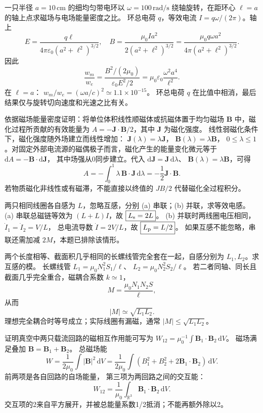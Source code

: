 一只半径 $a=10\,\mathrm{cm}$ 的细均匀带电环以 $\omega=100\,\mathrm{rad/s}$ 绕轴旋转，在距环心 $\ell=a$ 的轴上点求磁场与电场能量密度之比。
\exsolution
环总电荷 $q$，等效电流
$I=q\omega/(2\pi)$。轴上
\[
E=\frac{q\ell}{4\pi\varepsilon_0(a^2+\ell^2)^{3/2}},
\quad
B=\frac{\mu_0Ia^2}{2(a^2+\ell^2)^{3/2}}
=\frac{\mu_0q\omega a^2}{4\pi(a^2+\ell^2)^{3/2}}.
\]
因此
\[
\frac{w_m}{w_e}
=\frac{B^2/(2\mu_0)}{\varepsilon_0E^2/2}
=\boxed{\mu_0\varepsilon_0\frac{\omega^2a^4}{\ell^2}}.
\]
在 $\ell=a$：
$\boxed{w_m/w_e=(\omega a/c)^2\simeq1.1\times10^{-15}}$。
\excheck 环总电荷 $q$ 在比值中相消，最后结果仅与旋转切向速度和光速之比有关。

依据磁场能量密度证明：将单位体积线性顺磁体或抗磁体置于均匀磁场 $\bm B$ 中，磁化过程所贡献的有效能量为
$A=-\bm J\cdot\bm B/2$，其中 $\bm J$ 为磁化强度。
\exsolution
线性弱磁化条件下，磁化强度随外场建立而线性增加：
$\bm J(\lambda)=\lambda\bm J$，
$\bm B(\lambda)=\lambda\bm B$，
$0\le\lambda\le1$。对固定外部电流源的磁偶极子而言，磁化产生的能量变化微元等于
$\mathrm dA=-\bm B\cdot\mathrm d\bm J$，
其中场强从0同步建立。代入
$\mathrm d\bm J=\bm J\,\mathrm d\lambda$、
$\bm B(\lambda)=\lambda\bm B$，可得
\[
A=-\int_0^1\lambda\,\bm B\cdot\bm J\,\mathrm d\lambda
=\boxed{-\frac12\bm J\cdot\bm B}.
\]
\excheck 若物质磁化非线性或有磁滞，不能直接以终值的 $JB/2$ 代替磁化全过程积分。

两只相同线圈各自感为 $L$，忽略互感，分别 (a) 串联；(b) 并联，求等效电感。
\exsolution
(a) 串联总磁链等效为
$(L+L)I$，故
$\boxed{L_{\rm s}=2L}$。
(b) 并联时两线圈电压相同，
$\dot I_1=\dot I_2=V/L$，
总电流导数 $\dot I=2V/L$，故
$\boxed{L_{\rm p}=L/2}$。
\excheck 如果互感不能忽略，串联还需加减 $2M$，本题已排除该情形。

两个长度相等、截面积几乎相同的长螺线管完全套在一起，自感分别为 $L_1,L_2$。求互感的模。
\exsolution
长螺线管
$L_1=\mu_0N_1^2S_1/\ell$、
$L_2=\mu_0N_2^2S_2/\ell$。
若二者同轴、同长且截面几乎完全重合，磁耦合系数 $k\simeq1$，
\[
M=\frac{\mu_0N_1N_2S}{\ell},
\]
从而
\[
\boxed{|M|\simeq\sqrt{L_1L_2}}.
\]
\excheck 理想完全耦合时等号成立；实际线圈有漏磁，通常 $|M|\le\sqrt{L_1L_2}$。

证明真空中两只载流回路的磁相互作用能可写为
$W_{12}=\mu_0^{-1}\int\bm B_1\cdot\bm B_2\,\mathrm dV$。
\exsolution
磁场满足叠加 $\bm B=\bm B_1+\bm B_2$。
总磁场能
\[
W=\frac1{2\mu_0}\int|\bm B|^2\,\mathrm dV
=\frac1{2\mu_0}\int(B_1^2+B_2^2+
2\bm B_1\cdot\bm B_2)\,\mathrm dV.
\]
前两项是各自回路的自场能量，
第三项为两回路之间的交互能：
\[
\boxed{W_{12}=\frac1{\mu_0}
\int_{\mathbb R^3}\bm B_1\cdot\bm B_2\,\mathrm dV}.
\]
\excheck 交互项的2来自平方展开，并被总能量系数1/2抵消；不能再额外除以2。


